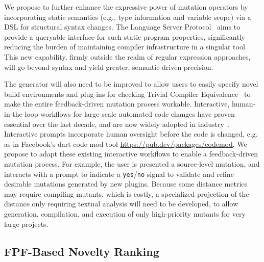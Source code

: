 We propose to further enhance the expressive power of mutation operators by
incorporating static semantics (e.g., type information and variable scope) via a
DSL for structural syntax changes. The Language Server Protocol~\cite{lsp-web} aims to
provide a queryable interface for such static program properties, significantly
reducing the burden of maintaining compiler infrastructure in a singular tool.
This new capability, firmly outside the realm of regular
expression approaches, will go beyond syntax and yield greater, semantic-driven precision.

The generator will also need to be improved to allow users to easily specify
novel build environments and plug-ins for checking Trivial Compiler
Equivalence~\cite{TCE} to make the entire feedback-driven mutation process
workable. Interactive, human-in-the-loop workflows for large-scale automated
code changes have proven essential over the last decade, and are now widely
adopted in industry~\cite{codemod-gh,
  codemod-fb-post-by-codemod-author, dart-codemod}. Interactive
prompts incorporate human oversight before the code is changed,
e.g. as in Facebook's dart code mod tool \url{https://pub.dev/packages/codemod}. 
We propose to adapt these existing interactive workflows to enable a
feedback-driven mutation process. For example, the user is presented a source-level mutation, and interacts with a prompt to indicate a {\tt yes}/{\tt no} signal
to validate and refine desirable mutations generated by new plugins.
 Because some distance
metrics may require compiling mutants, which is costly, a specialized
projection of the distance only requiring textual analysis will need
to be developed, to allow generation, compilation, and execution of
only high-priority mutants for very large projects.


\subsection{FPF-Based Novelty Ranking}
\label{sec:fpfplan}



